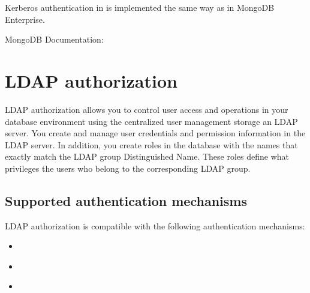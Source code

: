 \documentclass[letterpaper,10pt,english]{sphinxmanual}
\begin{document}
\sphinxAtStartPar
Kerberos authentication in  is implemented the same way as in MongoDB Enterprise.


\nopagebreak


\sphinxAtStartPar
MongoDB Documentation: 




\chapter{LDAP authorization}
\label{\detokenize{authorization:ldap-authorization}}\label{\detokenize{authorization:id1}}\label{\detokenize{authorization::doc}}
\sphinxAtStartPar
LDAP authorization allows you to control user access and operations in your database environment using the centralized user management storage \textendash{} an LDAP server. You create and manage user credentials and permission information in the LDAP server. In addition, you create roles in the  database with the names that exactly match the LDAP group Distinguished Name. These roles define what privileges the users who belong to the corresponding LDAP group.


\section{Supported authentication mechanisms}
\label{\detokenize{authorization:supported-authentication-mechanisms}}\label{\detokenize{authorization:auth-mech}}
\sphinxAtStartPar
LDAP authorization is compatible with the following authentication mechanisms:
\begin{itemize}
\item {} 
\sphinxAtStartPar
{\hyperref[\detokenize{authentication:x509}]{}}

\item {} 
\sphinxAtStartPar
{\hyperref[\detokenize{authentication:kerberos-authentication}]{}}

\item {} 
\sphinxAtStartPar
{\hyperref[\detokenize{authorization:native-ldap}]{}}

\end{itemize}
\end{document}
